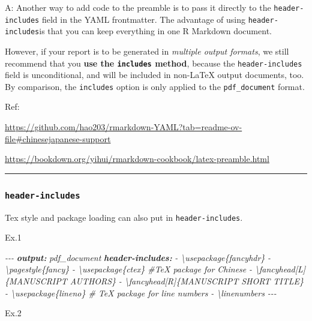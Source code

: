 \documentclass[
  a4paper,
  twoside,
  openright]{book}
\newenvironment{Shaded}{\begin{snugshade}}{\end{snugshade}}
\newcommand{\AnnotationTok}[1]{\textcolor[rgb]{0.56,0.35,0.01}{\textbf{\textit{#1}}}}
\newcommand{\CommentTok}[1]{\textcolor[rgb]{0.56,0.35,0.01}{\textit{#1}}}
\theoremstyle{definition}
\theoremstyle{definition}
\theoremstyle{definition}
\theoremstyle{definition}
\theoremstyle{remark}
\begin{document}
A: Another way to add code to the preamble is to pass it directly to the \texttt{header-includes} field in the YAML frontmatter. The advantage of using \texttt{header-includes}is that you can keep everything in one R Markdown document.

However, if your report is to be generated in \emph{multiple output formats}, we still recommend that you \textbf{use the \texttt{includes} method}, because the \texttt{header-includes} field is unconditional, and will be included in non-LaTeX output documents, too. By comparison, the \texttt{includes} option is only applied to the \texttt{pdf\_document} format.

Ref:

\url{https://github.com/hao203/rmarkdown-YAML?tab=readme-ov-file\#chinesejapanese-support}

\url{https://bookdown.org/yihui/rmarkdown-cookbook/latex-preamble.html}

\begin{center}\rule{0.5\linewidth}{0.5pt}\end{center}

\subsubsection*{\texorpdfstring{\texttt{header-includes}}{header-includes}}\label{header-includes}

Tex style and package loading can also put in \texttt{header-includes}.

Ex.1

\begin{Shaded}
\begin{Highlighting}[]
\CommentTok{{-}{-}{-}}
\AnnotationTok{output:}\CommentTok{ pdf\_document}
\AnnotationTok{header{-}includes:}
\CommentTok{ {-} \textbackslash{}usepackage\{fancyhdr\}}
\CommentTok{ {-} \textbackslash{}pagestyle\{fancy\}}
\CommentTok{ {-} \textbackslash{}usepackage\{ctex\} \#TeX package for  Chinese}
\CommentTok{ {-} \textbackslash{}fancyhead[L]\{MANUSCRIPT AUTHORS\}}
\CommentTok{ {-} \textbackslash{}fancyhead[R]\{MANUSCRIPT SHORT TITLE\}}
\CommentTok{ {-} \textbackslash{}usepackage\{lineno\} \# TeX package for line numbers}
\CommentTok{ {-} \textbackslash{}linenumbers}
\CommentTok{{-}{-}{-}}
\end{Highlighting}
\end{Shaded}

Ex.2
\end{document}

